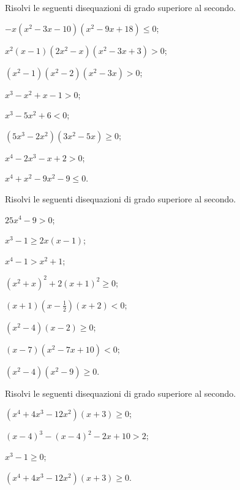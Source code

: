 \begin{esercizio}[\Ast]
\label{ese:4.34}
Risolvi le seguenti disequazioni di grado superiore al secondo.
\begin{multicols}{2}
\begin{enumeratea}
\item $-x\left(x^2-3x-10\right)\left(x^2-9x+18\right)\le 0$;
\item $x^2(x-1)\left(2x^2-x\right)\left(x^2-3x+3\right)>0$;
\item $\left(x^2-1\right)\left(x^2-2\right)\left(x^2-3x\right)>0$;
\item $x^3-x^2+x-1>0$;
\item $x^3-5x^2+6<0$;
\item $\left(5x^3-2x^2\right)\left(3x^2-5x\right)\ge 0$;
\item $x^4-2x^3-x+2>0$;
\item $x^4+x^2-9x^2-9\le 0$.
\end{enumeratea}
\end{multicols}
\end{esercizio}

\begin{esercizio}[\Ast]
\label{ese:4.35}
Risolvi le seguenti disequazioni di grado superiore al secondo.
\begin{multicols}{2}
\begin{enumeratea}
\item $25x^4-9>0$;
\item $x^3-1\ge 2x(x-1)$;
\item $x^4-1>x^2+1$;
\item $\left(x^2+x\right)^2+2\left(x+1\right)^2\ge 0$;
\item $(x+1)\left(x-\frac 1 2\right)(x+2)<0$;
\item $\left(x^2-4\right)(x-2)\ge 0$; %
\item $(x-7)\left(x^2-7x+10\right)<0$;
\item $\left(x^2-4\right)\left(x^2-9\right)\ge 0$.
\end{enumeratea}
\end{multicols}
\end{esercizio}

\begin{esercizio}[\Ast]
 \label{ese:4.36}
Risolvi le seguenti disequazioni di grado superiore al secondo.
\begin{multicols}{2}
\begin{enumeratea}
\item $\left(x^4+4x^3-12x^2\right)\left(x+3\right)\ge 0$;
\item $(x-4)^3-(x-4)^2-2x+10>2$;
\item $x^3-1\ge 0$;
\item $\left(x^4+4x^3-12x^2\right)\left(x+3\right)\ge 0$.
\end{enumeratea}
\end{multicols}
\end{esercizio}

